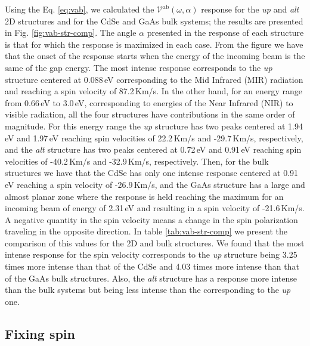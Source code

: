 \documentclass[prb,11pt,tightenlines,twocolumn,aps]{revtex4-1}
\begin{document}
{\color{red}Using the Eq. \eqref{eq:vab}, we calculated the
$\mathcal{V}^{\mathrm{ab}}(\omega,\alpha)$ response for the \emph{up} and
\emph{alt} 2D structures and for the CdSe and GaAs bulk systems; the results
are presented in Fig. \ref{fig:vab-str-comp}. The angle $\alpha$ presented in
the response of each structure is that for which the response is maximized in
each case.}
% 
From the figure we have that the onset of the response starts when the energy
of the incoming beam is the same of the gap energy.
% 
The most intense response corresponds to the \emph{up} structure centered at
0.088\,eV corresponding to the {\color{red} Mid Infrared (MIR)} radiation and
reaching a spin velocity of 87.2\,Km/s.
% 
In the other hand, for an energy range from 0.66\,eV to 3.0\,eV, corresponding
to energies of the {\color{red} Near Infrared (NIR) to visible radiation}, all
the four structures have contributions in the same order of magnitude.
% 
For this energy range the \emph{up} structure has two peaks centered at
1.94\,eV and 1.97\,eV reaching spin velocities of 22.2\,Km/s and -29.7\,Km/s,
respectively, and the \emph{alt} structure has two peaks centered at 0.72\,eV
and 0.91\,eV reaching spin velocities of -40.2\,Km/s and -32.9\,Km/s,
respectively.
% 
Then, for the bulk structures we have that the CdSe has only one intense
response centered at 0.91\,eV reaching a spin velocity of -26.9\,Km/s, and the
GaAs structure has a large and almost planar zone where the response is held
reaching the maximum for an incoming beam of energy of 2.31\,eV and resulting
in a spin velocity of -21.6\,Km/s.
% 
{\color{red} A negative quantity in the spin velocity means a change in the
spin polarization traveling in the opposite direction.
% 
In table \ref{tab:vab-str-comp} we present the comparison of this values for
the 2D and bulk structures. We found that the most intense response for the
spin velocity corresponds to the \emph{up} structure being 3.25 times more
intense than that of the CdSe and 4.03 times more intense than that of the GaAs
bulk structures. Also, the \emph{alt} structure has a response more intense
than the bulk systems but being less intense than the corresponding to the
\emph{up} one.}
% 




\subsection{Fixing spin} %
\label{sec:res-fixspin}
\end{document}
